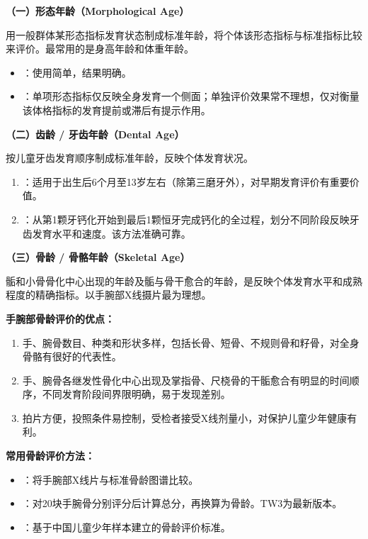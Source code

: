 \begin{keybox}
\textbf{（一）形态年龄（Morphological Age）}

用一般群体某形态指标发育状态制成标准年龄，将个体该形态指标与标准指标比较来评价。最常用的是身高年龄和体重年龄。

\begin{itemize}[leftmargin=*]
    \item {}：使用简单，结果明确。
    \item {}：单项形态指标仅反映全身发育一个侧面；单独评价效果常不理想，仅对衡量该体格指标的发育提前或滞后有提示作用。
\end{itemize}
\textbf{（二）齿龄 / 牙齿年龄（Dental Age）}

按儿童牙齿发育顺序制成标准年龄，反映个体发育状况。

\begin{enumerate}[leftmargin=*]
    \item {}：适用于出生后6个月至13岁左右（除第三磨牙外），对早期发育评价有重要价值。
    \item {}：从第1颗牙钙化开始到最后1颗恒牙完成钙化的全过程，划分不同阶段反映牙齿发育水平和速度。该方法准确可靠。
\end{enumerate}

\textbf{（三）骨龄 / 骨骼年龄（Skeletal Age）\difficulty}

骺和小骨骨化中心出现的年龄及骺与骨干愈合的年龄，是反映个体发育水平和成熟程度的精确指标。以手腕部X线摄片最为理想。

\textbf{手腕部骨龄评价的优点：}

\begin{enumerate}[leftmargin=*]
    \item 手、腕骨数目、种类和形状多样，包括长骨、短骨、不规则骨和籽骨，对全身骨骼有很好的代表性。
    \item 手、腕骨各继发性骨化中心出现及掌指骨、尺桡骨的干骺愈合有明显的时间顺序，不同发育阶段间界限明确，易于发现差别。
    \item 拍片方便，投照条件易控制，受检者接受X线剂量小，对保护儿童少年健康有利。
\end{enumerate}

\textbf{常用骨龄评价方法：}

\begin{itemize}[leftmargin=*]
    \item {}：将手腕部X线片与标准骨龄图谱比较。
    \item {}：对20块手腕骨分别评分后计算总分，再换算为骨龄。TW3为最新版本。
    \item {}：基于中国儿童少年样本建立的骨龄评价标准。
\end{itemize}


\end{keybox}
